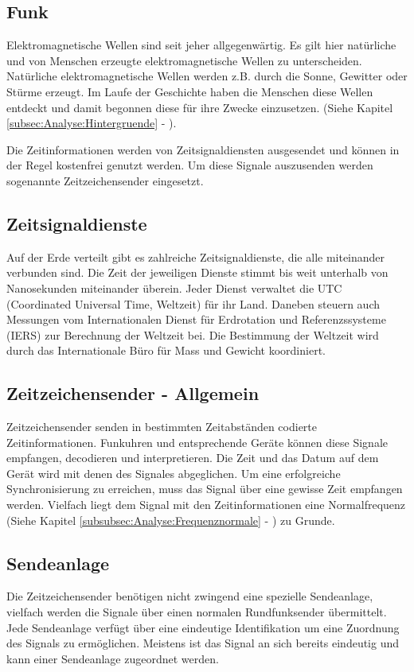 \subsection{Funk}
Elektromagnetische Wellen sind seit jeher allgegenwärtig. Es gilt hier natürliche und von Menschen erzeugte elektromagnetische Wellen zu unterscheiden. Natürliche elektromagnetische Wellen werden z.B. durch die Sonne, Gewitter oder Stürme erzeugt. Im Laufe der Geschichte haben die Menschen diese Wellen entdeckt und damit begonnen diese für ihre Zwecke einzusetzen. (Siehe Kapitel \ref{subsec:Analyse:Hintergruende} - ).

Die Zeitinformationen werden von Zeitsignaldiensten ausgesendet und können in der Regel kostenfrei genutzt werden. Um diese Signale auszusenden werden sogenannte Zeitzeichensender eingesetzt. 

\subsection{Zeitsignaldienste}
Auf der Erde verteilt gibt es zahlreiche Zeitsignaldienste, die alle miteinander verbunden sind. Die Zeit der jeweiligen Dienste stimmt bis weit unterhalb von Nanosekunden miteinander überein. Jeder Dienst verwaltet die UTC (Coordinated Universal Time, Weltzeit) für ihr Land. Daneben steuern auch Messungen vom Internationalen Dienst für Erdrotation und Referenzssysteme (IERS) zur Berechnung der Weltzeit bei.
Die Bestimmung der Weltzeit wird durch das Internationale Büro für Mass und Gewicht koordiniert. 

\subsection{Zeitzeichensender - Allgemein}

Zeitzeichensender senden in bestimmten Zeitabständen codierte Zeitinformationen. Funkuhren und entsprechende Geräte können diese Signale empfangen, decodieren und interpretieren. Die Zeit und das Datum auf dem Gerät wird mit denen des Signales abgeglichen. Um eine erfolgreiche Synchronisierung zu erreichen, muss das Signal über eine gewisse Zeit empfangen werden. Vielfach liegt dem Signal mit den Zeitinformationen eine Normalfrequenz (Siehe Kapitel \ref{subsubsec:Analyse:Frequenznormale} - ) zu Grunde.

\subsection{Sendeanlage}
Die Zeitzeichensender benötigen nicht zwingend eine spezielle Sendeanlage, vielfach werden die Signale über einen normalen Rundfunksender übermittelt. Jede Sendeanlage verfügt über eine eindeutige Identifikation um eine Zuordnung des Signals zu ermöglichen. Meistens ist das Signal an sich bereits eindeutig und kann einer Sendeanlage zugeordnet werden.

